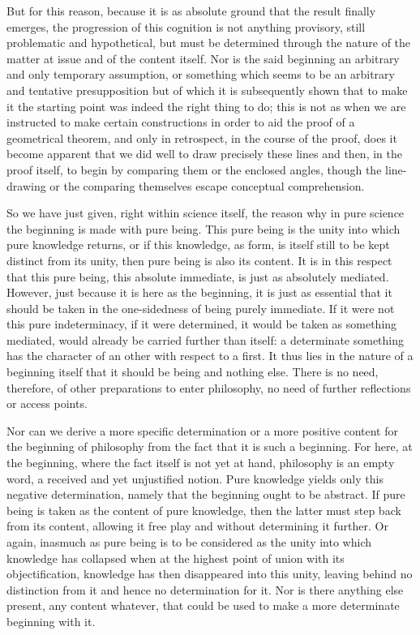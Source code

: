 But for this reason,
because it is as absolute ground
that the result finally emerges,
the progression of this cognition
is not anything provisory,
still problematic and hypothetical,
but must be determined through the nature
of the matter at issue and of the content itself.
Nor is the said beginning an
arbitrary and only temporary assumption,
or something which seems to be an
arbitrary and tentative presupposition
but of which it is subsequently shown
that to make it the starting point
was indeed the right thing to do;
this is not as when we are instructed
to make certain constructions in order
to aid the proof of a geometrical theorem,
and only in retrospect, in the course of the proof,
does it become apparent that we did well to draw
precisely these lines and then, in the proof itself,
to begin by comparing them or the enclosed angles,
though the line-drawing or the comparing
themselves escape conceptual comprehension.

So we have just given, right within science itself,
the reason why in pure science
the beginning is made with pure being.
This pure being is the unity
into which pure knowledge returns,
or if this knowledge, as form,
is itself still to be kept
distinct from its unity,
then pure being is also its content.
It is in this respect that this pure being,
this absolute immediate,
is just as absolutely mediated.
However, just because it is here as the beginning,
it is just as essential that it should be taken
in the one-sidedness of being purely immediate.
If it were not this pure indeterminacy,
if it were determined,
it would be taken as something mediated,
would already be carried further than itself:
a determinate something has the character of an other
with respect to a first.
It thus lies in the nature of a beginning itself
that it should be being and nothing else.
There is no need, therefore,
of other preparations to enter philosophy,
no need of further reflections or access points.

Nor can we derive a more specific determination
or a more positive content
for the beginning of philosophy
from the fact that it is such a beginning.
For here, at the beginning, where the fact
itself is not yet at hand,
philosophy is an empty word,
a received and yet unjustified notion.
Pure knowledge yields only this negative determination,
namely that the beginning ought to be abstract.
If pure being is taken as the content of pure knowledge,
then the latter must step back from its content,
allowing it free play and without determining it further.
Or again, inasmuch as pure being is to be considered
as the unity into which knowledge has collapsed
when at the highest point of union with its objectification,
knowledge has then disappeared into this unity,
leaving behind no distinction from it
and hence no determination for it.
Nor is there anything else present, any content whatever,
that could be used to make a more determinate beginning with it.

